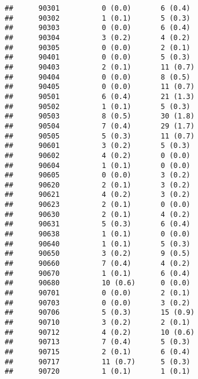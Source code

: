 \documentclass[]{article}
\begin{document}
\begin{verbatim}
##      90301          0 (0.0)       6 (0.4)                        
##      90302          1 (0.1)       5 (0.3)                        
##      90303          0 (0.0)       6 (0.4)                        
##      90304          3 (0.2)       4 (0.2)                        
##      90305          0 (0.0)       2 (0.1)                        
##      90401          0 (0.0)       5 (0.3)                        
##      90403          2 (0.1)       11 (0.7)                       
##      90404          0 (0.0)       8 (0.5)                        
##      90405          0 (0.0)       11 (0.7)                       
##      90501          6 (0.4)       21 (1.3)                       
##      90502          1 (0.1)       5 (0.3)                        
##      90503          8 (0.5)       30 (1.8)                       
##      90504          7 (0.4)       29 (1.7)                       
##      90505          5 (0.3)       11 (0.7)                       
##      90601          3 (0.2)       5 (0.3)                        
##      90602          4 (0.2)       0 (0.0)                        
##      90604          1 (0.1)       0 (0.0)                        
##      90605          0 (0.0)       3 (0.2)                        
##      90620          2 (0.1)       3 (0.2)                        
##      90621          4 (0.2)       3 (0.2)                        
##      90623          2 (0.1)       0 (0.0)                        
##      90630          2 (0.1)       4 (0.2)                        
##      90631          5 (0.3)       6 (0.4)                        
##      90638          1 (0.1)       0 (0.0)                        
##      90640          1 (0.1)       5 (0.3)                        
##      90650          3 (0.2)       9 (0.5)                        
##      90660          7 (0.4)       4 (0.2)                        
##      90670          1 (0.1)       6 (0.4)                        
##      90680          10 (0.6)      0 (0.0)                        
##      90701          0 (0.0)       2 (0.1)                        
##      90703          0 (0.0)       3 (0.2)                        
##      90706          5 (0.3)       15 (0.9)                       
##      90710          3 (0.2)       2 (0.1)                        
##      90712          4 (0.2)       10 (0.6)                       
##      90713          7 (0.4)       5 (0.3)                        
##      90715          2 (0.1)       6 (0.4)                        
##      90717          11 (0.7)      5 (0.3)                        
##      90720          1 (0.1)       1 (0.1)                        

\end{verbatim}
\end{document}
